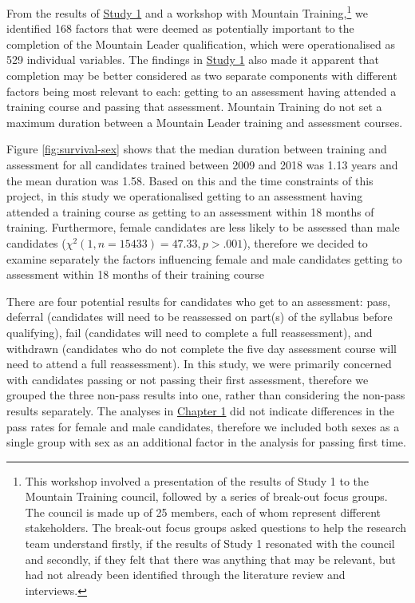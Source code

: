 \documentclass[
  12pt,
  a4paper,
]{book}
\begin{document}
From the results of \protect\hyperlink{ml-qualitative}{Study 1} and a workshop with Mountain Training,\footnote{This workshop involved a presentation of the results of Study 1 to the Mountain Training council, followed by a series of break-out focus groups. The council is made up of 25 members, each of whom represent different stakeholders. The break-out focus groups asked questions to help the research team understand firstly, if the results of Study 1 resonated with the council and secondly, if they felt that there was anything that may be relevant, but had not already been identified through the literature review and interviews.} we identified 168 factors that were deemed as potentially important to the completion of the Mountain Leader qualification, which were operationalised as 529 individual variables. The findings in \protect\hyperlink{ml-qualitative}{Study 1} also made it apparent that completion may be better considered as two separate components with different factors being most relevant to each: getting to an assessment having attended a training course and passing that assessment. Mountain Training do not set a maximum duration between a Mountain Leader training and assessment courses.

Figure \ref{fig:survival-sex} shows that the median duration between training and assessment for all candidates trained between 2009 and 2018 was 1.13 years and the mean duration was 1.58. Based on this and the time constraints of this project, in this study we operationalised getting to an assessment having attended a training course as getting to an assessment within 18 months of training. Furthermore, female candidates are less likely to be assessed than male candidates (\(\chi^2( 1 ,n = 15433 )= 47.33 ,p>.001\)), therefore we decided to examine separately the factors influencing female and male candidates getting to assessment within 18 months of their training course

There are four potential results for candidates who get to an assessment: pass, deferral (candidates will need to be reassessed on part(s) of the syllabus before qualifying), fail (candidates will need to complete a full reassessment), and withdrawn (candidates who do not complete the five day assessment course will need to attend a full reassessment). In this study, we were primarily concerned with candidates passing or not passing their first assessment, therefore we grouped the three non-pass results into one, rather than considering the non-pass results separately. The analyses in \protect\hyperlink{gen-intro}{Chapter 1} did not indicate differences in the pass rates for female and male candidates, therefore we included both sexes as a single group with sex as an additional factor in the analysis for passing first time.
\end{document}
